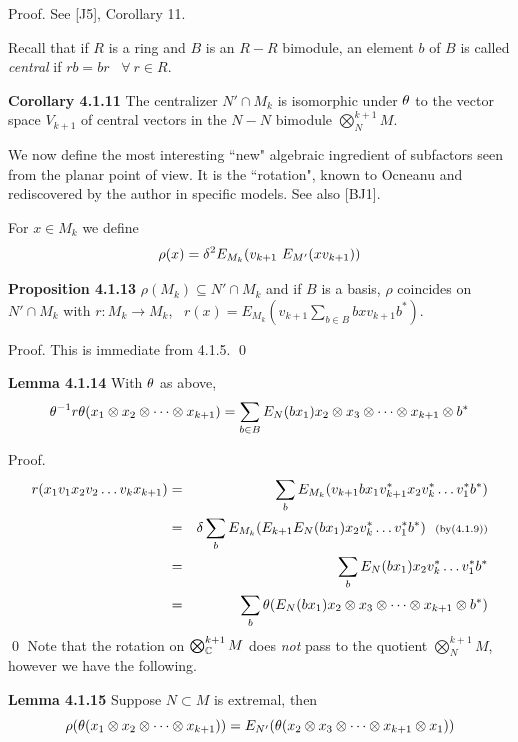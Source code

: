 \bs
{\sc Proof.} See [J5], Corollary 11.

\bs Recall that if $R$ is a ring and $B$ is an $R-R$ bimodule, an
element $b$ of $B$ is called {\it central} if
$rb=br$ \ $\forall \ r\in R$.

\bs\ni
{\bf Corollary 4.1.11} The centralizer $N'\cap M_k$ is
isomorphic under $\theta$ to the vector space $V_{k+1}$
of central vectors in the $N-N$ bimodule $\bigotimes^{k+1}_N M$.

\bs
We now define the most interesting ``new" algebraic ingredient of
subfactors seen from the planar point of view. It is the
``rotation", known to Ocneanu and rediscovered by the author in
specific models. See also [BJ1].

 For $x\in M_k$ we define
$$
\rho(x)=\d^2 E_{M_k} (v_{k+1} \ E_{M'}(xv_{k+1}))
$$

\bs\ni
{\bf Proposition 4.1.13} $\rho(M_k)\subseteq N'\cap M_k$
and if $B$ is a basis, $\rho$ coincides on $N'\cap M_k$
with $r:M_k\to M_k$, \ $r(x)=E_{M_k} (v_{k+1} \sum_{b\in B}
bx v_{k+1}b^*)$.

\bigskip
{\sc Proof.} This is immediate from 4.1.5. \qed

\bs\ni
{\bf Lemma 4.1.14} With $\theta$ as above,
$$
\theta^{-1}r\theta(x_1\otimes x_2\otimes\dots\otimes x_{k+1}) =
\sum_{b\in B} E_N(bx_1)x_2\otimes x_3\otimes\dots\otimes
x_{k+1}\otimes b^*
$$

\bigskip
{\sc Proof.}
\begin{eqnarray*}
r(x_1v_1x_2v_2\dots v_kx_{k+1}) &  = &
\sum_b E_{M_k}  (v_{k+1}bx_1 v^*_{k+1}x_2v^*_k\dots v^*_1b^*) \\
& = & \delta\sum_b E_{M_k} (E_{k+1}E_N(bx_1)x_2v_k^*\dots v^*_1b^*) \ \
{\scriptstyle{\rm (by (4.1.9))}} \\
& = & \sum_b E_N(bx_1)x_2v^*_k \dots v^*_1b^* \\
& = & \sum_b\theta(E_N(bx_1)x_2\otimes x_3\otimes\dots \otimes
x_{k+1}\otimes b^*)
\end{eqnarray*}
\qed
Note that the rotation on $\bigotimes^{k+1}_{\Bbb C} M$ does {\it
not} pass to the quotient $\bigotimes^{k+1}_N M$, however we have
the following.

{\bf Lemma 4.1.15} Suppose $N\subset M$ is extremal, then
$$
\rho(\theta(x_1\otimes x_2\otimes\dots\otimes x_{k+1})) =
E_{N'}(\theta(x_2\otimes x_3\otimes\dots\otimes x_{k+1}
\otimes x_1))
$$

